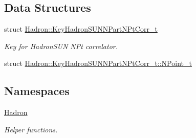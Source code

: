 \subsection*{Data Structures}
\begin{DoxyCompactItemize}
\item 
struct \mbox{\hyperlink{structHadron_1_1KeyHadronSUNNPartNPtCorr__t}{Hadron\+::\+Key\+Hadron\+S\+U\+N\+N\+Part\+N\+Pt\+Corr\+\_\+t}}
\begin{DoxyCompactList}\small\item\em Key for Hadron\+S\+UN N\+Pt correlator. \end{DoxyCompactList}\item 
struct \mbox{\hyperlink{structHadron_1_1KeyHadronSUNNPartNPtCorr__t_1_1NPoint__t}{Hadron\+::\+Key\+Hadron\+S\+U\+N\+N\+Part\+N\+Pt\+Corr\+\_\+t\+::\+N\+Point\+\_\+t}}
\end{DoxyCompactItemize}
\subsection*{Namespaces}
\begin{DoxyCompactItemize}
\item 
 \mbox{\hyperlink{namespaceHadron}{Hadron}}
\begin{DoxyCompactList}\small\item\em Helper functions. \end{DoxyCompactList}\end{DoxyCompactItemize}
